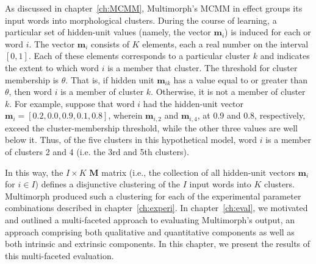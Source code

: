 As discussed in chapter~\ref{ch:MCMM}, Multimorph's \ac{MCMM} in effect groups its input words into morphological clusters. 
During the course of learning, a particular set of hidden-unit values (namely, the vector $\mathbf{m}_{i}$) is induced for each or word $i$. 
The vector $\mathbf{m}_{i}$ consists of $K$ elements, each a real number on the interval $[0,1]$. 
Each of these elements corresponds to a particular cluster $k$ and indicates the extent to which word $i$ is a member that cluster.
The threshold for cluster membership is $\theta$. That is, if hidden unit $\mathbf{m}_{ik}$ has a value equal to or greater than 
$\theta$, then word $i$ is a member of cluster $k$. Otherwise, it is not a member of cluster $k$. 
For example, suppose that word $i$ had the hidden-unit vector $\mathbf{m}_{i} = [0.2, 0.0,0.9,0.1,0.8]$, 
wherein $\mathbf{m}_{i,2}$ and $\mathbf{m}_{i,4}$, at 0.9 and 0.8, respectively, exceed the cluster-membership 
threshold, while the other three values
are well below it. Thus, of the five clusters in this hypothetical model, word $i$ is a member of clusters 
2 and 4 (i.e. the 3rd and 5th clusters).


In this way, the $I \times K$ $\mathbf{M}$ matrix (i.e., the collection of all hidden-unit vectors $\mathbf{m}_i$ for $i \in I$) 
defines a disjunctive clustering of the $I$ input words into $K$ clusters. Multimorph produced such a clustering for 
each of the experimental parameter combinations described in chapter~\ref{ch:experi}. In chapter~\ref{ch:eval}, 
we motivated and outlined a multi-faceted approach to evaluating Multimorph's output, an approach comprising 
both qualitative and quantitative components as well as both intrinsic and extrinsic components. 
In this chapter, we present the results of this multi-faceted evaluation. 



